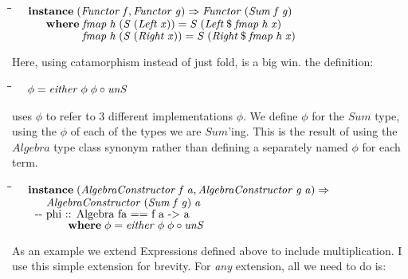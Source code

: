 \documentclass[10pt]{article}
\newlength{\lwidth}\setlength{\lwidth}{4.5cm}
\newlength{\cwidth}\setlength{\cwidth}{8mm} %
\newcommand{\Conid}[1]{\mathit{#1}}
\newcommand{\Varid}[1]{\mathit{#1}}
\begin{document}
\begin{tabbing}
\qquad\=\hspace{\lwidth}\=\hspace{\cwidth}\=\+\kill
${\hskip1.00em\relax\mathbf{instance}\;(\Conid{Functor}\;\Varid{f},\Conid{Functor}\;\Varid{g})\Rightarrow \Conid{Functor}\;(\Conid{Sum}\;\Varid{f}\;\Varid{g})}$\\
${\hskip1.00em\relax\hskip2.00em\relax\mathbf{where}\;\Varid{fmap}\;\Varid{h}\;(\Conid{S}\;(\Conid{Left}\;\Varid{x}))\mathrel{=}\Conid{S}\;(\Conid{Left}\mathbin{\$}\Varid{fmap}\;\Varid{h}\;\Varid{x})}$\\
${\hskip1.00em\relax\hskip2.00em\relax\phantom{\mathbf{where}\;\mbox{}}\Varid{fmap}\;\Varid{h}\;(\Conid{S}\;(\Conid{Right}\;\Varid{x}))\mathrel{=}\Conid{S}\;(\Conid{Right}\mathbin{\$}\Varid{fmap}\;\Varid{h}\;\Varid{x})}$
\end{tabbing}
Here, using catamorphism instead of just fold, is a big win.
the definition:

\begin{tabbing}
\qquad\=\hspace{\lwidth}\=\hspace{\cwidth}\=\+\kill
${\hskip1.00em\relax\Varid{\phi}\mathrel{=}\Varid{either}\;\Varid{\phi}\;\Varid{\phi}\mathbin{\circ}\Varid{unS}}$
\end{tabbing}
uses \ensuremath{\Varid{\phi}} to refer to 3 different implementations \ensuremath{\Varid{\phi}}.  We define
\ensuremath{\Varid{\phi}} for the \ensuremath{\Conid{Sum}} type, using the \ensuremath{\Varid{\phi}} of each of the types we are
\ensuremath{\Conid{Sum}}'ing.  This is the result of using the \ensuremath{\Conid{Algebra}} type class
synonym rather than defining a separately named \ensuremath{\Varid{\phi}} for each term.

\begin{tabbing}
\qquad\=\hspace{\lwidth}\=\hspace{\cwidth}\=\+\kill
${\hskip1.00em\relax\mathbf{instance}\;(\Conid{AlgebraConstructor}\;\Varid{f}\;\Varid{a},\Conid{AlgebraConstructor}\;\Varid{g}\;\Varid{a})\Rightarrow }$\\
${\hskip1.00em\relax\hskip2.00em\relax\Conid{AlgebraConstructor}\;(\Conid{Sum}\;\Varid{f}\;\Varid{g})\;\Varid{a}}$\\
${\mbox{\qquad-{}-      phi :: Algebra fa == f a -> a}}$\\
${\hskip5.00em\relax\mathbf{where}\;\Varid{\phi}\mathrel{=}\Varid{either}\;\Varid{\phi}\;\Varid{\phi}\mathbin{\circ}\Varid{unS}}$
\end{tabbing}
As an example we extend Expressions defined above to include
multiplication.  I use this simple extension for brevity.  For
\emph{any} extension, all we need to do is:
\end{document}
